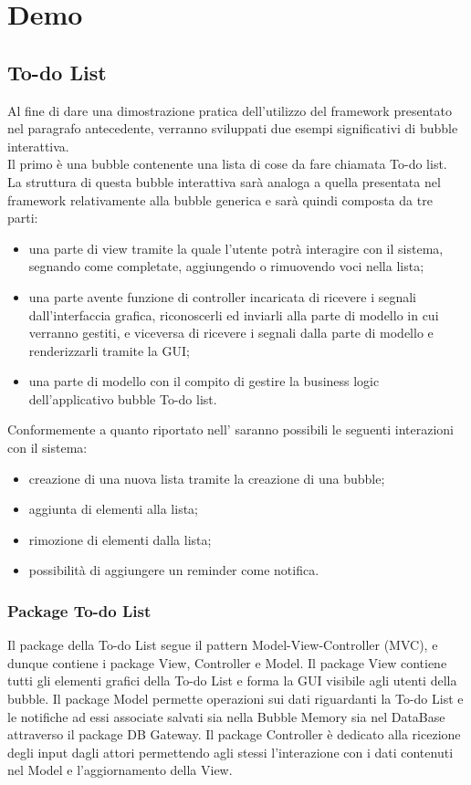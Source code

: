 \section{Demo}

\subsection{To-do List}
Al fine di dare una dimostrazione pratica dell'utilizzo del framework presentato nel paragrafo antecedente, verranno sviluppati due esempi significativi di bubble interattiva.\\
Il primo è una bubble contenente una lista di cose da fare chiamata To-do list.\\
La struttura di questa bubble interattiva sarà analoga a quella presentata nel framework relativamente alla bubble generica e sarà quindi composta da tre parti:
\begin{itemize}
	\item una parte di view tramite la quale l'utente potrà interagire con il sistema, segnando come completate, aggiungendo o rimuovendo voci nella lista;
	\item una parte avente funzione di controller incaricata di ricevere i segnali dall'interfaccia grafica, riconoscerli ed inviarli alla parte di modello in cui verranno gestiti, e viceversa di ricevere i segnali dalla parte di modello e renderizzarli tramite la GUI;
	\item una parte di modello con il compito di gestire la business logic dell'applicativo bubble To-do list.
\end{itemize}
Conformemente a quanto riportato nell'\AnalisiDeiRequisiti{} saranno possibili le seguenti interazioni con il sistema:
\begin{itemize}
	\item creazione di una nuova lista tramite la creazione di una bubble;
	\item aggiunta di elementi alla lista;
	\item rimozione di elementi dalla lista;
	\item possibilità di aggiungere un reminder come notifica.
\end{itemize}

\subsubsection{Package To-do List}

Il package della To-do List segue il pattern Model-View-Controller (MVC), e dunque contiene i package View, Controller e Model. Il package View contiene tutti gli elementi grafici della To-do List e forma la GUI visibile agli utenti della bubble. Il package Model permette operazioni sui dati riguardanti la To-do List e le notifiche ad essi associate salvati sia nella Bubble Memory sia nel DataBase attraverso il package DB Gateway. Il package Controller è dedicato alla ricezione degli input dagli attori permettendo agli stessi l'interazione con i dati contenuti nel Model e l'aggiornamento della View.

